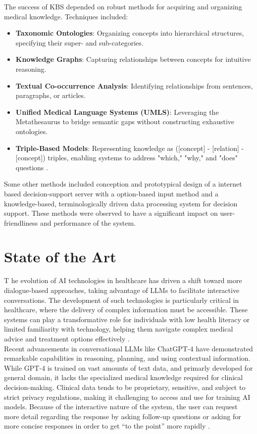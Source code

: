 \noindent The success of KBS depended on robust methods for acquiring and organizing medical knowledge. Techniques included:
\begin{itemize}
    \item \textcolor{TUMRed}{\textbf{Taxonomic Ontologies}}: Organizing concepts into hierarchical structures, specifying their super- and sub-categories.
    \item \textcolor{TUMRed}{\textbf{Knowledge Graphs}}: Capturing relationships between concepts for intuitive reasoning.
    \item \textcolor{TUMRed}{\textbf{Textual Co-occurrence Analysis}}: Identifying relationships from sentences, paragraphs, or articles.
    \item \textcolor{TUMRed}{\textbf{Unified Medical Language Systems (UMLS)}}: Leveraging the Metathesaurus to bridge semantic gaps without constructing exhaustive ontologies.
    \item \textcolor{TUMRed}{\textbf{Triple-Based Models}}: Representing knowledge as ([concept] - [relation] - [concept]) triples, enabling systems to address "which," "why," and "does" questions \cite{demner2009can}.
\end{itemize}

\noindent Some other methods included conception and prototypical design of a internet based decision-support server \cite{eich1999internet} with a option-based input method and a knowledge-based, terminologically driven data processing system for decision support. These methods were observed to have a significant impact on user-friendliness and performance of the system.

\section{State of the Art}
\lettrine{T}{ }he evolution of AI technologies in healthcare has driven a shift toward more dialogue-based approaches, taking advantage of LLMs to facilitate interactive conversations. The development of such technologies is particularly critical in healthcare, where the delivery of complex information must be accessible. These systems can play a transformative role for individuals with low health literacy or limited familiarity with technology, helping them navigate complex medical advice and treatment options effectively \cite{cohen2022intelligent}.\\[\baselineskip]

\noindent Recent advancements in conversational LLMs like ChatGPT-4 have demonstrated remarkable capabilities in reasoning, planning, and using contextual information. While GPT-4 is trained on vast amounts of text data, and primarly developed for general domain, it lacks the specialized medical knowledge required for clinical decision-making. Clinical data tends to be proprietary, sensitive, and subject to strict privacy regulations, making it challenging to access and use for training AI models. Because of the interactive nature of the system, the user can request more detail regarding the response by asking follow-up questions or asking for more concise responses in order to get “to the point” more rapidly \cite{lee2023benefits}.\\[\baselineskip]


